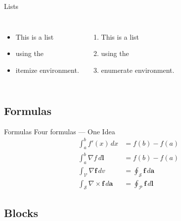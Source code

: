 \documentclass[fleqn,compress,utf8,aspectratio=169,t]{beamer}
\begin{document}
\begin{frame}{Lists}
 \begin{columns}[t]
  \begin{itemize}
   \item This is a list
   \item using the
   \item itemize environment.
  \end{itemize}
  \begin{enumerate}
   \item This is a list
   \item using the
   \item enumerate environment.
  \end{enumerate}
 \end{columns}
\end{frame}

\subsection{Formulas}

\begin{frame}{Formulas}
 Four formulas --- One Idea
 \begin{align}
  \int^{b}_{a} f'(x) \, dx                                 & = f(b) - f(a) \\
  \int^b_{a} \nabla f\,d\mathbf{l}                         & = f(b) - f(a) \\
  \int_{\mathcal{V}} \nabla\mathbf{f} \, dv                & =
  \oint_{\mathcal{S}} \mathbf{f} \, d\mathbf{a}                            \\
  \int_{\mathcal{S}} \nabla\times\mathbf{f} \, d\mathbf{a} & =
  \oint_{\mathcal{P}} \mathbf{f} \, d\mathbf{l}
 \end{align}
\end{frame}

\subsection{Blocks}
\end{document}
